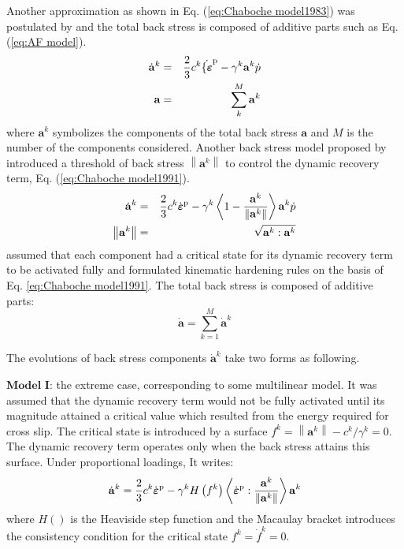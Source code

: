 \documentclass[final,5p,times,onecolumn,10pt,sort&compress]{elsarticle}
\newcommand{\bfepsilon}{{\mbox{\boldmath{$\varepsilon$}}}}
\begin{document}
Another approximation as shown in Eq. (\ref{eq:Chaboche model1983}) was postulated by \cite{Chaboche1983On} and the total back stress is composed of additive parts such as Eq. (\ref{eq:AF model}).
\begin{eqnarray}\label{eq:Chaboche model1983}
\dot{\mathbf{a}}^{k}&=&\frac{2}{3}c^{k}\dot{\{\bfepsilon}^{\rm p}-\gamma^{k} \mathbf{a}^{k}\dot{p}\\
\mathbf{a}&=&\sum_{k}^{M}\mathbf{a}^{k}
\end{eqnarray}
where $\mathbf{a}^{k}$ symbolizes the components of the total back stress $\mathbf{a}$ and $M$ is the number of the components considered. Another back stress model proposed by \cite{Chaboche1991On} introduced a threshold of back stress $\left\|\mathbf{a}^{k}\right\|$ to control the dynamic recovery term, Eq. (\ref{eq:Chaboche model1991}).
\begin{eqnarray}\label{eq:Chaboche model1991}
\dot{\mathbf{a}}^{k}&=&\frac{2}{3} c^{k} \dot{\bfepsilon}^{\mathrm{p}}-\gamma^{k}\left\langle 1-\frac{\mathbf{a}^{k}}{\left\|\mathbf{a}^{k}\right\|}\right\rangle \mathbf{a}^{k} \dot{p}\\
\left\|\mathbf{a}^{k}\right\|&=&\sqrt{\mathbf{a}^{k} : \mathbf{a}^{k}}
\end{eqnarray}
\cite{Ohno1993Kinematic} assumed that each component had a critical state for its dynamic recovery term to be activated fully and formulated kinematic hardening rules on the basis of Eq. \ref{eq:Chaboche model1991}. The total back stress is composed of additive parts:
\begin{equation}
\dot{\mathbf{a}}=\sum_{k=1}^{M} \dot{\mathbf{a}}^{k}
\end{equation}

The evolutions of back stress components $\dot{\mathbf{a}}^{k}$ take two forms as following.

$\textbf{Model I}$: the extreme case, corresponding to some multilinear model. It was assumed that the dynamic recovery term would not be fully activated until its magnitude attained a critical value which resulted from the energy required for cross slip. The critical state is introduced by a surface $f^{k}=\left\|\mathbf{a}^{k}\right\|-c^{k} / \gamma^{k}=0$. The dynamic recovery term operates only when the back stress attains this surface. Under proportional loadings, It writes:
\begin{equation}\label{eq:Ohno Wang model 1}
\dot{\mathbf{a}}^{k}=\frac{2}{3}c^{k}\dot{\bfepsilon}^{\rm p}-\gamma^{k} H\left ( f^{k} \right )\left \langle \dot{\bfepsilon}^{\rm p}: \frac{\mathbf{a}^{k}}{\left \| \mathbf{a}^{k} \right \|}\right \rangle\mathbf{a}^{k}\\
\end{equation}
where $H\left( \right)$ is the Heaviside step function and the Macaulay bracket introduces the consistency condition for the critical state $f^{k}=\dot{f}^{k}=0$.
\end{document}

